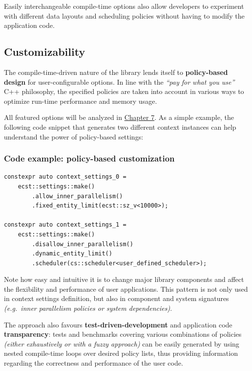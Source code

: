 \documentclass[twoside, 12pt, a4paper, openright]{book}
\begin{document}
Easily interchangeable compile-time options also allow developers to
experiment with different data layouts and scheduling policies without
having to modify the application code.

\subsection{Customizability}\label{customizability}

The compile-time-driven nature of the library lends itself to
\textbf{policy-based design} for user-configurable options. In line with
the \emph{``pay for what you use''} C++ philosophy, the specified
policies are taken into account in various ways to optimize run-time
performance and memory usage.

All featured options will be analyzed in
\protect\hyperlink{chap_ecst_compiletime}{Chapter 7}. As a simple
example, the following code snippet that generates two different context
instances can help understand the power of policy-based settings:

\subsubsection{Code example: policy-based
customization}\label{code-example-policy-based-customization}

\begin{verbatim}
constexpr auto context_settings_0 =
    ecst::settings::make()
        .allow_inner_parallelism()
        .fixed_entity_limit(ecst::sz_v<10000>);

constexpr auto context_settings_1 =
    ecst::settings::make()
        .disallow_inner_parallelism()
        .dynamic_entity_limit()
        .scheduler(cs::scheduler<user_defined_scheduler>);
\end{verbatim}

Note how easy and intuitive it is to change major library components and
affect the flexibility and performance of user applications. This
pattern is not only used in context settings definition, but also in
component and system signatures \emph{(e.g.~inner parallelism policies
or system dependencies)}.

The approach also favours \textbf{test-driven-development} and
application code \textbf{transparency}: tests and benchmarks covering
various combinations of policies \emph{(either exhaustively or with a
fuzzy approach)} can be easily generated by using nested compile-time
loops over desired policy lists, thus providing information regarding
the correctness and performance of the user code.
\end{document}
